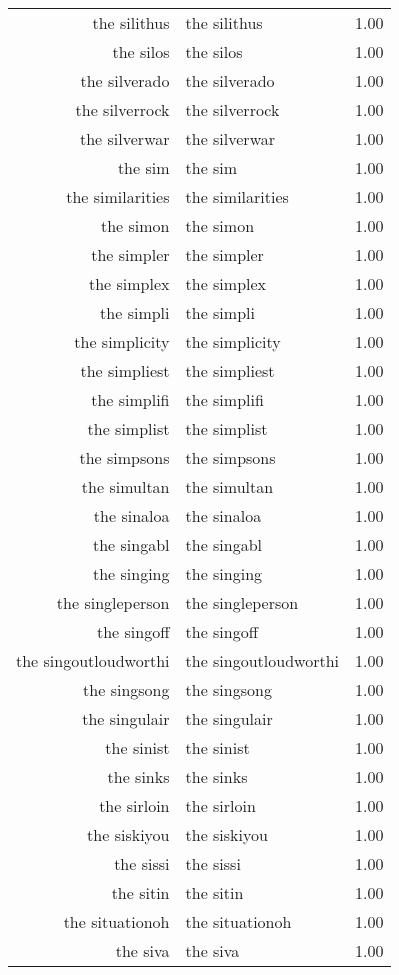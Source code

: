 \begin{table}[ht]
\begin{tabular}{rlr}
  the silithus & the silithus & 1.00 \\ 
  the silos & the silos & 1.00 \\ 
  the silverado & the silverado & 1.00 \\ 
  the silverrock & the silverrock & 1.00 \\ 
  the silverwar & the silverwar & 1.00 \\ 
  the sim & the sim & 1.00 \\ 
  the similarities & the similarities & 1.00 \\ 
  the simon & the simon & 1.00 \\ 
  the simpler & the simpler & 1.00 \\ 
  the simplex & the simplex & 1.00 \\ 
  the simpli & the simpli & 1.00 \\ 
  the simplicity & the simplicity & 1.00 \\ 
  the simpliest & the simpliest & 1.00 \\ 
  the simplifi & the simplifi & 1.00 \\ 
  the simplist & the simplist & 1.00 \\ 
  the simpsons & the simpsons & 1.00 \\ 
  the simultan & the simultan & 1.00 \\ 
  the sinaloa & the sinaloa & 1.00 \\ 
  the singabl & the singabl & 1.00 \\ 
  the singing & the singing & 1.00 \\ 
  the singleperson & the singleperson & 1.00 \\ 
  the singoff & the singoff & 1.00 \\ 
  the singoutloudworthi & the singoutloudworthi & 1.00 \\ 
  the singsong & the singsong & 1.00 \\ 
  the singulair & the singulair & 1.00 \\ 
  the sinist & the sinist & 1.00 \\ 
  the sinks & the sinks & 1.00 \\ 
  the sirloin & the sirloin & 1.00 \\ 
  the siskiyou & the siskiyou & 1.00 \\ 
  the sissi & the sissi & 1.00 \\ 
  the sitin & the sitin & 1.00 \\ 
  the situationoh & the situationoh & 1.00 \\ 
  the siva & the siva & 1.00 \\ 

\end{tabular}
\end{table}
